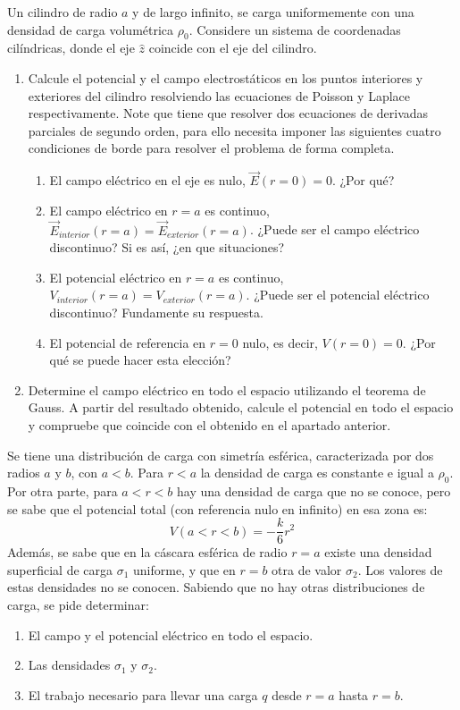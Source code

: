 \np
Un cilindro de radio $a$ y de largo infinito, se carga uniformemente con una densidad de carga volumétrica $\rho_0$. Considere un sistema de coordenadas cilíndricas, donde el eje $\hat{z}$ coincide con el eje del cilindro. 
\begin{enumerate}[label=\alph*)]
    \item Calcule el potencial y el campo electrostáticos en los puntos interiores y exteriores del cilindro resolviendo las ecuaciones de Poisson y Laplace respectivamente. Note que tiene que resolver dos ecuaciones de derivadas parciales de segundo orden, para ello necesita imponer las siguientes cuatro condiciones de borde para resolver el problema de forma completa.
    \begin{enumerate}[label=\arabic*)]
        \item El campo eléctrico en el eje es nulo, $\Vec{E}(r=0)=0$. ¿Por qué?
        \item El campo eléctrico en $r=a$ es continuo,\newline $\Vec{E}_{interior}(r=a)=\Vec{E}_{exterior}(r=a)$. ¿Puede ser el campo eléctrico discontinuo? Si es así, ¿en que situaciones?
        \item El potencial eléctrico en $r=a$ es continuo, $V_{interior}(r=a) = V_{exterior}(r=a)$. ¿Puede ser el potencial eléctrico discontinuo? Fundamente su respuesta.
        \item El potencial de referencia en $r=0$ nulo, es decir, $V(r=0) = 0$. ¿Por qué se puede hacer esta elección?
    \end{enumerate}
    \item Determine el campo eléctrico en todo el espacio utilizando el teorema de Gauss. A partir del resultado obtenido, calcule el potencial en todo el espacio y compruebe que coincide con el obtenido en el apartado anterior.
\end{enumerate}


\np
Se tiene una distribución de carga con simetría esférica, caracterizada por dos radios $a$ y $b$, con $a < b$. Para $r < a$ la densidad de carga es constante e igual a $\rho_0$. Por otra parte, para $a < r < b$ hay una densidad de carga que no se conoce, pero se sabe que el potencial total (con referencia nulo en infinito) en esa zona es: 
\[V(a<r<b)=-\frac{k}{6}r^2\]
Además, se sabe que en la cáscara esférica de radio $r=a$ existe una densidad superficial de carga $\sigma_1$ uniforme, y que en $r=b$ otra de valor $\sigma_2$. Los valores de estas densidades no se conocen. Sabiendo que no hay otras distribuciones de carga, se pide determinar:
\begin{enumerate}[label=\alph*)]
    \item El campo y el potencial eléctrico en todo el espacio.
    \item Las densidades $\sigma_1$ y $\sigma_2$.%
    \item El trabajo necesario para llevar una carga $q$ desde $r=a$ hasta $r=b$. 
\end{enumerate}

